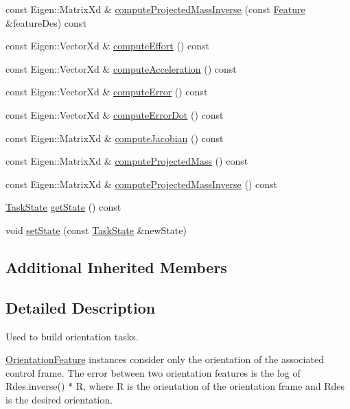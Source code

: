 \begin{DoxyCompactItemize}
\item 
const Eigen\+::\+Matrix\+Xd \& \hyperlink{classocra_1_1OrientationFeature_a91ee3679497110a92298d4c31022eecd}{compute\+Projected\+Mass\+Inverse} (const \hyperlink{classocra_1_1Feature}{Feature} \&feature\+Des) const 
\item 
const Eigen\+::\+Vector\+Xd \& \hyperlink{classocra_1_1OrientationFeature_add30eefc0c36e9ddafc6f1f76c6b3b3b}{compute\+Effort} () const 
\item 
const Eigen\+::\+Vector\+Xd \& \hyperlink{classocra_1_1OrientationFeature_a7787b315c5a5af39744804ba7692512d}{compute\+Acceleration} () const 
\item 
const Eigen\+::\+Vector\+Xd \& \hyperlink{classocra_1_1OrientationFeature_a3ba82b84f588a1f3886aac13ab0cc4f9}{compute\+Error} () const 
\item 
const Eigen\+::\+Vector\+Xd \& \hyperlink{classocra_1_1OrientationFeature_a139803f9a1e2ab1690ee5e87e097a667}{compute\+Error\+Dot} () const 
\item 
const Eigen\+::\+Matrix\+Xd \& \hyperlink{classocra_1_1OrientationFeature_acc2ee39128e76b8ebbcbf2e6c8233bae}{compute\+Jacobian} () const 
\item 
const Eigen\+::\+Matrix\+Xd \& \hyperlink{classocra_1_1OrientationFeature_ade010543ecb2fa43bd8fc03a483a1ec9}{compute\+Projected\+Mass} () const 
\item 
const Eigen\+::\+Matrix\+Xd \& \hyperlink{classocra_1_1OrientationFeature_a76c69d9b51a2043f7fde2ad98cba5205}{compute\+Projected\+Mass\+Inverse} () const 
\item 
\hyperlink{classocra_1_1TaskState}{Task\+State} \hyperlink{classocra_1_1OrientationFeature_a95f9930a2d552dcf958e296dd5ca1dc9}{get\+State} () const 
\item 
void \hyperlink{classocra_1_1OrientationFeature_a2a3b8eb5334d6dcd8f3b2fc40aac46ad}{set\+State} (const \hyperlink{classocra_1_1TaskState}{Task\+State} \&new\+State)
\end{DoxyCompactItemize}
\subsection*{Additional Inherited Members}


\subsection{Detailed Description}
Used to build orientation tasks. 

\hyperlink{classocra_1_1OrientationFeature}{Orientation\+Feature} instances consider only the orientation of the associated control frame. The error between two orientation features is the log of Rdes.\+inverse() $\ast$ R, where R is the orientation of the orientation frame and Rdes is the desired orientation. 

